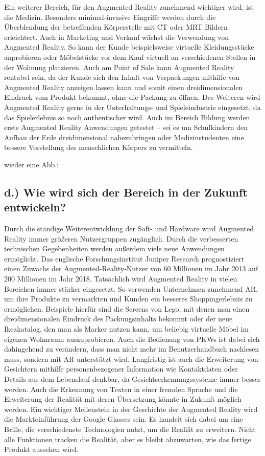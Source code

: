 \documentclass[12pt,utf8]{scrartcl}
\begin{document}
Ein weiterer Bereich, für den Augmented Reality zunehmend wichtiger wird, ist die Medizin. Besonders minimal-invasive Eingriffe werden durch die Überblendung der betreffenden Körperstelle mit CT oder MRT Bildern erleichtert. Auch in Marketing und Verkauf wächst die Verwendung von Augmented Reality. So kann der Kunde beispielsweise virtuelle Kleidungsstücke anprobieren oder Möbelstücke vor dem Kauf virtuell an verschiedenen Stellen in der Wohnung platzieren. Auch am Point of Sale kann Augmented Reality rentabel sein, da der Kunde sich den Inhalt von Verpackungen mithilfe von Augmented Reality anzeigen lassen kann und somit einen dreidimensionalen Eindruck vom Produkt bekommt, ohne die Packung zu öffnen. Des Weiteren wird Augmented Reality gerne in der Unterhaltungs- und Spieleindustrie eingesetzt, da das Spielerlebnis so noch authentischer wird. Auch im Bereich Bildung werden erste Augmented Reality Anwendungen getestet – sei es um Schulkindern den Aufbau der Erde dreidimensional nahezubringen oder Medizinstudenten eine bessere Vorstellung des menschlichen Körpers zu vermitteln.
\linebreak

wieder eine Abb.:

\subsection{\label{sub4:thema}d.) Wie wird sich der Bereich in der Zukunft entwickeln?}

Durch die ständige Weiterentwicklung der Soft- und Hardware wird Augmented Reality immer größeren Nutzergruppen zugänglich. Durch die verbesserten technischen Gegebenheiten werden außerdem viele neue Anwendungen ermöglicht. Das englische Forschungsinstitut Juniper Research prognostiziert einen Zuwachs der Augmented-Reality-Nutzer von 60 Millionen im Jahr 2013 auf 200 Millionen im Jahr 2018. Tatsächlich wird Augmented Reality in vielen Bereichen immer stärker eingesetzt. So verwenden Unternehmen zunehmend AR, um ihre Produkte zu vermarkten und Kunden ein besseres Shoppingerlebnis zu ermöglichen. Beispiele hierfür sind die Screens von Lego, mit denen man einen dreidimensionalen Eindruck des Packungsinhalts bekommt oder der neue Ikeakatalog, den man als Marker nutzen kann, um beliebig virtuelle Möbel im eigenen Wohnraum auszuprobieren. Auch die Bedienung von PKWs ist dabei sich dahingehend zu verändern, dass man nicht mehr im Benutzerhandbuch nachlesen muss, sondern mit AR unterstützt wird. Langfristig ist auch die Erweiterung von Gesichtern mithilfe personenbezogener Information wie Kontaktdaten oder Details aus dem Lebenslauf denkbar, da Gesichtserkennungssysteme immer besser werden. Auch die Erkennung von Texten in einer fremden Sprache und die Erweiterung der Realität mit deren Übersetzung könnte in Zukunft möglich werden. Ein wichtiger Meilenstein in der Geschichte der Augmented Reality wird die Markteinführung der Google Glasses sein. Es handelt sich dabei um eine Brille, die verschiedenste Technologien nutzt, um die Realiät zu erweitern. Nicht alle Funktionen tracken die Realität, aber es bleibt abzuwarten, wie das fertige Produkt aussehen wird.
\end{document}

